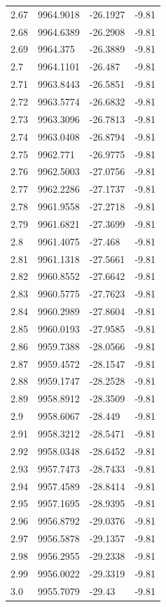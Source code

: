 \begin{table}[H]
\begin{tabular}{llll}
2.67 & 9964.9018 & -26.1927 & -9.81 \\
2.68 & 9964.6389 & -26.2908 & -9.81 \\
2.69 & 9964.375 & -26.3889 & -9.81 \\
2.7 & 9964.1101 & -26.487 & -9.81 \\
2.71 & 9963.8443 & -26.5851 & -9.81 \\
2.72 & 9963.5774 & -26.6832 & -9.81 \\
2.73 & 9963.3096 & -26.7813 & -9.81 \\
2.74 & 9963.0408 & -26.8794 & -9.81 \\
2.75 & 9962.771 & -26.9775 & -9.81 \\
2.76 & 9962.5003 & -27.0756 & -9.81 \\
2.77 & 9962.2286 & -27.1737 & -9.81 \\
2.78 & 9961.9558 & -27.2718 & -9.81 \\
2.79 & 9961.6821 & -27.3699 & -9.81 \\
2.8 & 9961.4075 & -27.468 & -9.81 \\
2.81 & 9961.1318 & -27.5661 & -9.81 \\
2.82 & 9960.8552 & -27.6642 & -9.81 \\
2.83 & 9960.5775 & -27.7623 & -9.81 \\
2.84 & 9960.2989 & -27.8604 & -9.81 \\
2.85 & 9960.0193 & -27.9585 & -9.81 \\
2.86 & 9959.7388 & -28.0566 & -9.81 \\
2.87 & 9959.4572 & -28.1547 & -9.81 \\
2.88 & 9959.1747 & -28.2528 & -9.81 \\
2.89 & 9958.8912 & -28.3509 & -9.81 \\
2.9 & 9958.6067 & -28.449 & -9.81 \\
2.91 & 9958.3212 & -28.5471 & -9.81 \\
2.92 & 9958.0348 & -28.6452 & -9.81 \\
2.93 & 9957.7473 & -28.7433 & -9.81 \\
2.94 & 9957.4589 & -28.8414 & -9.81 \\
2.95 & 9957.1695 & -28.9395 & -9.81 \\
2.96 & 9956.8792 & -29.0376 & -9.81 \\
2.97 & 9956.5878 & -29.1357 & -9.81 \\
2.98 & 9956.2955 & -29.2338 & -9.81 \\
2.99 & 9956.0022 & -29.3319 & -9.81 \\
3.0 & 9955.7079 & -29.43 & -9.81 \\

\end{tabular}
\end{table}
